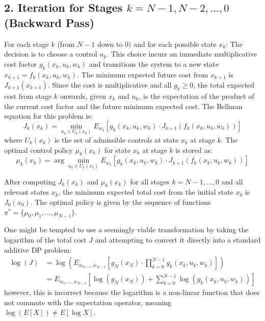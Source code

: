 \documentclass[11pt, a4paper, oneside]{memoir}
\begin{document}
\subsection*{2. Iteration for Stages $k = N-1, N-2, \dots, 0$ (Backward Pass)}
For each stage $k$ (from $N-1$ down to $0$) and for each possible state $x_k$:
The decision is to choose a control $u_k$. This choice incurs an immediate multiplicative cost factor $g_k(x_k, u_k, w_k)$ and transitions the system to a new state $x_{k+1} = f_k(x_k, u_k, w_k)$. The minimum expected future cost from $x_{k+1}$ is $J_{k+1}(x_{k+1})$.
Since the cost is multiplicative and all $g_k \ge 0$, the total expected cost from stage $k$ onwards, given $x_k$ and $u_k$, is the expectation of the product of the current cost factor and the future minimum expected cost.
The Bellman equation for this problem is:
\[
  J_k(x_k) = \min_{u_k \in U_k(x_k)} E_{w_k}[g_k(x_k, u_k, w_k) \cdot J_{k+1}(f_k(x_k, u_k, w_k))]
\]
where $U_k(x_k)$ is the set of admissible controls at state $x_k$ at stage $k$.
The optimal control policy $\mu_k(x_k)$ for state $x_k$ at stage $k$ is stored as:
\[
  \mu_k(x_k) = \arg\min_{u_k \in U_k(x_k)} E_{w_k}[g_k(x_k, u_k, w_k) \cdot J_{k+1}(f_k(x_k, u_k, w_k))]
\]

After computing $J_k(x_k)$ and $\mu_k(x_k)$ for all stages $k=N-1, \dots, 0$ and all relevant states $x_k$,
the minimum expected total cost from the initial state $x_0$ is $J_0(x_0)$.
The optimal policy is given by the sequence of functions $\pi^* = \{\mu_0, \mu_1, \dots, \mu_{N-1}\}$.

One might be tempted to use a seemingly viable transformation by taking the logarithm of the total cost $J$
and attempting to convert it directly into a standard additive DP problem:
\begin{align*}
  \log(J) & = \log \left( E_{w_0, \dots, w_{N-1}}\left[g_N(x_N) \cdot \prod_{k=0}^{N-1} g_k(x_k, u_k, w_k)\right] \right) \\
          & = E_{w_0, \dots, w_{N-1}}\left[\log(g_N(x_N)) + \sum_{k=0}^{N-1} \log(g_k(x_k, u_k, w_k))\right]
\end{align*}
however, this is incorrect because the logarithm is a non-linear function that does not commute with the expectation operator, meaning $\log(E[X]) \neq E[\log X]$.
\end{document}
